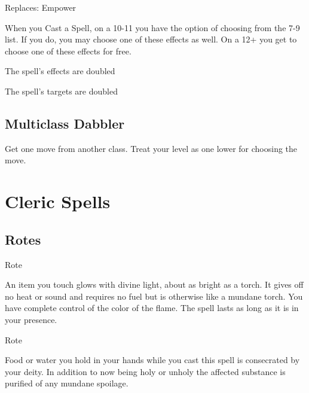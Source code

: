 Replaces: Empower

         

When you Cast a Spell, on a 10-11 you have the option of choosing from the 7-9 list. If you do, you may choose one of these effects as well. On a 12+ you get to choose one of these effects for free.

         
\startitemize[1,packed]
           
\item The spell’s effects are doubled

           
\item The spell’s targets are doubled

         
\stopitemize
         
\subsection{Multiclass Dabbler}    
         

Get one move from another class. Treat your level as one lower for choosing the move.

       

                
\section{Cleric Spells}    
     

       
\subsection{Rotes}   
       

         
\startSpellName
            	Rote
\stopSpellName
         

An item you touch glows with divine light, about as bright as a torch. It gives off no heat or sound and requires no fuel but is otherwise like a mundane torch. You have complete control of the color of the flame. The spell lasts as long as it is in your presence.

       

       
\startSpellName
          	Rote
\stopSpellName
       

Food or water you hold in your hands while you cast this spell is consecrated by your deity. In addition to now being holy or unholy the affected substance is purified of any mundane spoilage.

